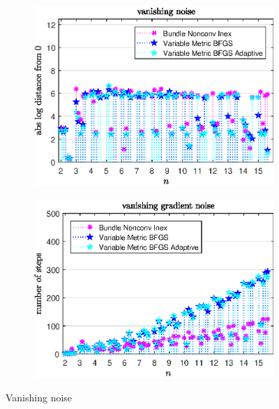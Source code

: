 \begin{figure}[ht]
	\begin{subfigure}{0.49\textwidth}
		\includegraphics[width=\textwidth]{Pictures/Plots/vanishing_noise2.eps}%
	\end{subfigure}
	\begin{subfigure}{0.49\textwidth}
		\includegraphics[width=\textwidth]{Pictures/Plots/steps_vanishing_noise2.eps}%
	\end{subfigure}
	\caption{Vanishing noise}%
	\label{fig_van_noise}%
\end{figure}

